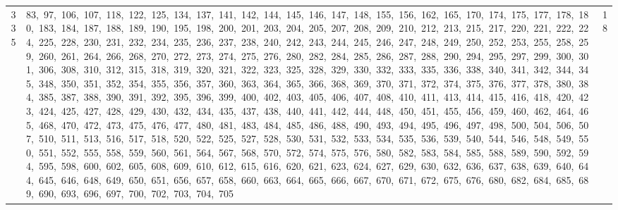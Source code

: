 \begin{longtable}{c|p{}|r}
335 & 83,\ 97,\ 106,\ 107,\ 118,\ 122,\ 125,\ 134,\ 137,\ 141,\ 142,\ 144,\ 145,\ 146,\ 147,\ 148,\ 155,\ 156,\ 162,\ 165,\ 170,\ 174,\ 175,\ 177,\ 178,\ 180,\ 183,\ 184,\ 187,\ 188,\ 189,\ 190,\ 195,\ 198,\ 200,\ 201,\ 203,\ 204,\ 205,\ 207,\ 208,\ 209,\ 210,\ 212,\ 213,\ 215,\ 217,\ 220,\ 221,\ 222,\ 224,\ 225,\ 228,\ 230,\ 231,\ 232,\ 234,\ 235,\ 236,\ 237,\ 238,\ 240,\ 242,\ 243,\ 244,\ 245,\ 246,\ 247,\ 248,\ 249,\ 250,\ 252,\ 253,\ 255,\ 258,\ 259,\ 260,\ 261,\ 264,\ 266,\ 268,\ 270,\ 272,\ 273,\ 274,\ 275,\ 276,\ 280,\ 282,\ 284,\ 285,\ 286,\ 287,\ 288,\ 290,\ 294,\ 295,\ 297,\ 299,\ 300,\ 301,\ 306,\ 308,\ 310,\ 312,\ 315,\ 318,\ 319,\ 320,\ 321,\ 322,\ 323,\ 325,\ 328,\ 329,\ 330,\ 332,\ 333,\ 335,\ 336,\ 338,\ 340,\ 341,\ 342,\ 344,\ 345,\ 348,\ 350,\ 351,\ 352,\ 354,\ 355,\ 356,\ 357,\ 360,\ 363,\ 364,\ 365,\ 366,\ 368,\ 369,\ 370,\ 371,\ 372,\ 374,\ 375,\ 376,\ 377,\ 378,\ 380,\ 384,\ 385,\ 387,\ 388,\ 390,\ 391,\ 392,\ 395,\ 396,\ 399,\ 400,\ 402,\ 403,\ 405,\ 406,\ 407,\ 408,\ 410,\ 411,\ 413,\ 414,\ 415,\ 416,\ 418,\ 420,\ 423,\ 424,\ 425,\ 427,\ 428,\ 429,\ 430,\ 432,\ 434,\ 435,\ 437,\ 438,\ 440,\ 441,\ 442,\ 444,\ 448,\ 450,\ 451,\ 455,\ 456,\ 459,\ 460,\ 462,\ 464,\ 465,\ 468,\ 470,\ 472,\ 473,\ 475,\ 476,\ 477,\ 480,\ 481,\ 483,\ 484,\ 485,\ 486,\ 488,\ 490,\ 493,\ 494,\ 495,\ 496,\ 497,\ 498,\ 500,\ 504,\ 506,\ 507,\ 510,\ 511,\ 513,\ 516,\ 517,\ 518,\ 520,\ 522,\ 525,\ 527,\ 528,\ 530,\ 531,\ 532,\ 533,\ 534,\ 535,\ 536,\ 539,\ 540,\ 544,\ 546,\ 548,\ 549,\ 550,\ 551,\ 552,\ 555,\ 558,\ 559,\ 560,\ 561,\ 564,\ 567,\ 568,\ 570,\ 572,\ 574,\ 575,\ 576,\ 580,\ 582,\ 583,\ 584,\ 585,\ 588,\ 589,\ 590,\ 592,\ 594,\ 595,\ 598,\ 600,\ 602,\ 605,\ 608,\ 609,\ 610,\ 612,\ 615,\ 616,\ 620,\ 621,\ 623,\ 624,\ 627,\ 629,\ 630,\ 632,\ 636,\ 637,\ 638,\ 639,\ 640,\ 644,\ 645,\ 646,\ 648,\ 649,\ 650,\ 651,\ 656,\ 657,\ 658,\ 660,\ 663,\ 664,\ 665,\ 666,\ 667,\ 670,\ 671,\ 672,\ 675,\ 676,\ 680,\ 682,\ 684,\ 685,\ 689,\ 690,\ 693,\ 696,\ 697,\ 700,\ 702,\ 703,\ 704,\ 705 & 18 \\

\end{longtable}
